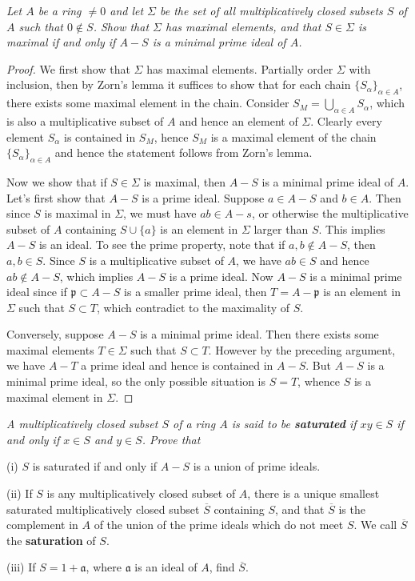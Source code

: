 \begin{problem}\em
Let $A$ be a ring $\ne 0$ and let $\Sigma$ be the set of all multiplicatively closed subsets $S$ of $A$ such that $0\notin S$. Show that $\Sigma$ has maximal elements, and that $S\in\Sigma$ is maximal if and only if $A-S$ is a minimal prime ideal of $A$.
\end{problem}
\begin{proof}
We first show that $\Sigma$ has maximal elements. Partially order $\Sigma$ with inclusion, then by Zorn's lemma it suffices to show that for each chain $\{S_\alpha\}_{\alpha\in A}$, there exists some maximal element in the chain. Consider $S_M=\bigcup_{\alpha\in A}S_\alpha$, which is also a multiplicative subset of $A$ and hence an element of $\Sigma$. Clearly every element $S_\alpha$ is contained in $S_M$, hence $S_M$ is a maximal element of the chain $\{S_\alpha\}_{\alpha\in A}$ and hence the statement follows from Zorn's lemma.\par
Now we show that if $S\in\Sigma$ is maximal, then $A-S$ is a minimal prime ideal of $A$. Let's first show that $A-S$ is a prime ideal. Suppose $a\in A-S$ and $b\in A$. Then since $S$ is maximal in $\Sigma$, we must have $ab\in A-s$, or otherwise the multiplicative subset of $A$ containing $S\cup\{a\}$ is an element in $\Sigma$ larger than $S$. This implies $A-S$ is an ideal. To see the prime property, note that if $a,b\notin A-S$, then $a,b\in S$. Since $S$ is a multiplicative subset of $A$, we have $ab\in S$ and hence $ab\notin A-S$, which implies $A-S$ is a prime ideal. Now $A-S$ is a minimal prime ideal since if $\mathfrak{p}\subset A-S$ is a smaller prime ideal, then $T=A-\mathfrak{p}$ is an element in $\Sigma$ such that $S\subset T$, which contradict to the maximality of $S$.\par
Conversely, suppose $A-S$ is a minimal prime ideal. Then there exists some maximal elements $T\in\Sigma$ such that $S\subset T$. However by the preceding argument, we have $A-T$ a prime ideal and hence is contained in $A-S$. But $A-S$ is a minimal prime ideal, so the only possible situation is $S=T$, whence $S$ is a maximal element in $\Sigma$.
\end{proof}
\begin{problem}\em
A multiplicatively closed subset $S$ of a ring $A$ is said to be \textbf{saturated} if $xy\in S$ if and only if $x\in S$ and $y\in S$. Prove that \par
(i) $S$ is saturated if and only if $A-S$ is a union of prime ideals.\par
(ii) If $S$ is any multiplicatively closed subset of $A$, there is a unique smallest saturated multiplicatively closed subset $\overline{S}$ containing $S$, and that $\overline{S}$ is the complement in $A$ of the union of the prime ideals which do not meet $S$. We call $\overline{S}$ the \textbf{saturation} of $S$.\par
(iii) If $S=1+\mathfrak{a}$, where $\mathfrak{a}$ is an ideal of $A$, find $\overline{S}$.
\end{problem}